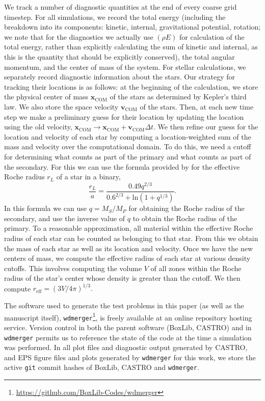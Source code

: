 \documentclass{emulateapj}
\begin{document}
We track a number of diagnostic quantities at the end of every coarse grid timestep. 
For all simulations, we record the total energy (including the breakdown into
its components: kinetic, internal, gravitational potential, rotation; we note
that for the diagnostics we actually use $(\rho E)$ for calculation of the total energy,
rather than explicitly calculating the sum of kinetic and internal, as this is
the quantity that should be explicitly conserved), 
the total angular momentum, and the center of mass of the system. 
For stellar calculations, we separately record diagnostic 
information about the stars. Our strategy for tracking their 
locations is as follows: at the beginning of the calculation, we store the 
physical center of mass $\mathbf{x}_{\text{COM}}$ of the stars as determined 
by Kepler's third law. We also store the space velocity $\mathbf{v}_{\text{COM}}$ 
of the stars. Then, at each new time step we make a preliminary guess for their 
location by updating the location using the old velocity, 
$\mathbf{x}_{\text{COM}} \rightarrow \mathbf{x}_{\text{COM}} + \mathbf{v}_{\text{COM}} \Delta t$.
We then refine our guess for the location and velocity of each star by computing a
location-weighted sum of the mass and velocity over the computational domain. 
To do this, we need a cutoff for determining what counts as part of the primary 
and what counts as part of the secondary. For this we can use the formula provided by 
\citet{eggleton:1983} for the effective Roche radius $r_L$ of a star in a binary,
\begin{equation}
  \frac{r_L}{a} = \frac{0.49 q^{2/3}}{0.6^{2/3} + \text{ln}(1 + q^{1/3})}.
\end{equation}
In this formula we can use $q = M_S / M_P$ for obtaining the Roche radius of the secondary,
and use the inverse value of $q$ to obtain the Roche radius of the primary.
To a reasonable approximation, all material within the effective Roche radius
of each star can be counted as belonging to that star. From this we obtain the mass
of each star as well as its location and velocity. Once we have the new centers of mass,
we compute the effective radius of each star at various density cutoffs. This involves 
computing the volume $V$ of all zones within the Roche radius of the star's center 
whose density is greater than the cutoff. We then compute $r_{\text{eff}} = (3V/4\pi)^{1/3}.$

The software used to generate the test problems in this paper
(as well as the manuscript itself),
\texttt{wdmerger}\footnote{\url{https://github.com/BoxLib-Codes/wdmerger}},
is freely available at an online repository hosting service.
Version control in both the parent software (BoxLib, CASTRO) and in \texttt{wdmerger}
permits us to reference the state of the code at the time a simulation
was performed. In all plot files and diagnostic output generated by CASTRO, 
and EPS figure files and plots generated by \texttt{wdmerger} for this work,
we store the active \texttt{git} commit hashes of BoxLib, CASTRO and \texttt{wdmerger}.
\end{document}
